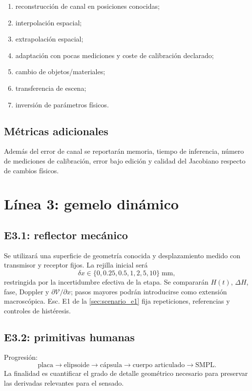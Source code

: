 \begin{enumerate}
\item reconstrucción de canal en posiciones conocidas;
\item interpolación espacial;
\item extrapolación espacial;
\item adaptación con pocas mediciones y coste de calibración declarado;
\item cambio de objetos/materiales;
\item transferencia de escena;
\item inversión de parámetros físicos.
\end{enumerate}

\subsection{Métricas adicionales}

Además del error de canal se reportarán memoria, tiempo de inferencia, número de mediciones de calibración, error bajo edición y calidad del Jacobiano respecto de cambios físicos.

\section{Línea 3: gemelo dinámico}

\subsection{E3.1: reflector mecánico}

Se utilizará una superficie de geometría conocida y desplazamiento medido con
transmisor y receptor fijos. La rejilla inicial será
\begin{equation}
\delta x\in\{0,0.25,0.5,1,2,5,10\}\;\mathrm{mm},
\end{equation}
restringida por la incertidumbre efectiva de la etapa. Se compararán $H(t)$,
$\Delta H$, fase, Doppler y $\partial\mathcal V/\partial x$; pasos mayores podrán
introducirse como extensión macroscópica. Esc. E1 de la \cref{sec:scenario_e1}
fija repeticiones, referencias y controles de histéresis.

\subsection{E3.2: primitivas humanas}

Progresión:
\begin{equation}
\text{placa}\rightarrow
\text{elipsoide}\rightarrow
\text{cápsula}\rightarrow
\text{cuerpo articulado}\rightarrow
\text{SMPL}.
\end{equation}
La finalidad es cuantificar el grado de detalle geométrico necesario para preservar las derivadas relevantes para el sensado.

